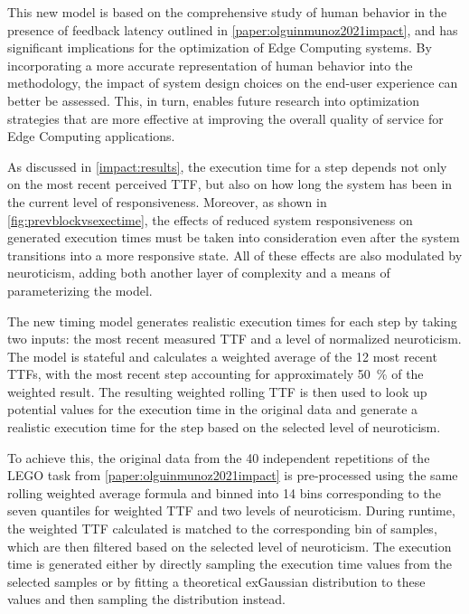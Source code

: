 This new model is based on the comprehensive study of human behavior in the presence of feedback latency outlined in \cref{paper:olguinmunoz2021impact}, and has significant implications for the optimization of Edge Computing systems.
By incorporating a more accurate representation of human behavior into the methodology, the impact of system design choices on the end-user experience can better be assessed.
This, in turn, enables future research into optimization strategies that are more effective at improving the overall quality of service for Edge Computing applications.

\medskip
As discussed in \cref{impact:results}, the execution time for a step depends not only on the most recent perceived \gls{TTF}, but also on how long the system has been in the current level of responsiveness.
Moreover, as shown in \cref{fig:prevblockvsexectime}, the effects of reduced system responsiveness on generated execution times must be taken into consideration even after the system transitions into a more responsive state.
All of these effects are also modulated by neuroticism, adding both another layer of complexity and a means of parameterizing the model.

The new timing model generates realistic execution times for each step by taking two inputs: the most recent measured \gls{TTF} and a level of normalized neuroticism.
The model is stateful and calculates a weighted average of the 12 most recent \glspl{TTF}, with the most recent step accounting for approximately \SI{50}{\percent} of the weighted result.
The resulting weighted rolling \gls{TTF} is then used to look up potential values for the execution time in the original data and generate a realistic execution time for the step based on the selected level of neuroticism.

To achieve this, the original data from the \num{40} independent repetitions of the LEGO task from \cref{paper:olguinmunoz2021impact} is pre-processed using the same rolling weighted average formula and binned into \num{14} bins corresponding to the seven quantiles for weighted TTF and two levels of neuroticism.
During runtime, the weighted \gls{TTF} calculated is matched to the corresponding bin of samples, which are then filtered based on the selected level of neuroticism.
The execution time is generated either by directly sampling the execution time values from the selected samples or by fitting a theoretical \gls{exGaussian} distribution to these values and then sampling the distribution instead.

